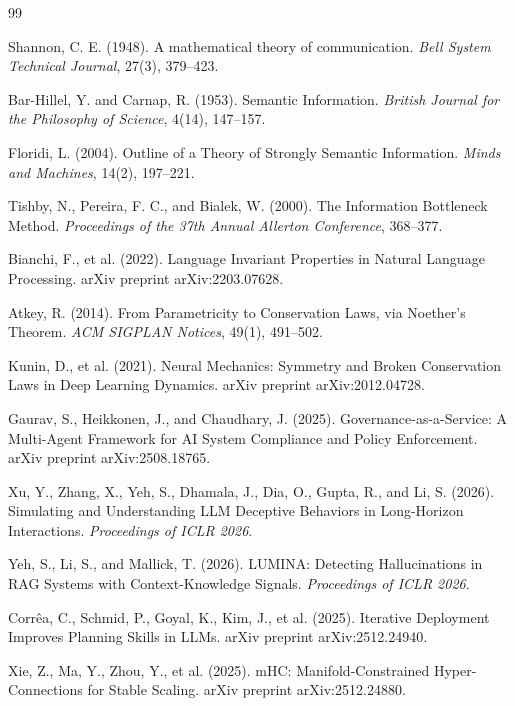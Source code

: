 \documentclass[11pt,a4paper]{article}
\begin{document}

\begin{thebibliography}{99}
\sloppy
\raggedright

Shannon, C. E. (1948).
A mathematical theory of communication.
\textit{Bell System Technical Journal}, 27(3), 379--423.

Bar-Hillel, Y. and Carnap, R. (1953).
Semantic Information.
\textit{British Journal for the Philosophy of Science}, 4(14), 147--157.

Floridi, L. (2004).
Outline of a Theory of Strongly Semantic Information.
\textit{Minds and Machines}, 14(2), 197--221.

Tishby, N., Pereira, F. C., and Bialek, W. (2000).
The Information Bottleneck Method.
\textit{Proceedings of the 37th Annual Allerton Conference}, 368--377.

Bianchi, F., et al. (2022).
Language Invariant Properties in Natural Language Processing.
arXiv preprint arXiv:2203.07628.

Atkey, R. (2014).
From Parametricity to Conservation Laws, via Noether's Theorem.
\textit{ACM SIGPLAN Notices}, 49(1), 491--502.

Kunin, D., et al. (2021).
Neural Mechanics: Symmetry and Broken Conservation Laws in Deep Learning Dynamics.
arXiv preprint arXiv:2012.04728.

Gaurav, S., Heikkonen, J., and Chaudhary, J. (2025).
Governance-as-a-Service: A Multi-Agent Framework for AI System Compliance and Policy Enforcement.
arXiv preprint arXiv:2508.18765.

Xu, Y., Zhang, X., Yeh, S., Dhamala, J., Dia, O., Gupta, R., and Li, S. (2026).
Simulating and Understanding LLM Deceptive Behaviors in Long-Horizon Interactions.
\textit{Proceedings of ICLR 2026}.

Yeh, S., Li, S., and Mallick, T. (2026).
LUMINA: Detecting Hallucinations in RAG Systems with Context-Knowledge Signals.
\textit{Proceedings of ICLR 2026}.

Corr\^ea, C., Schmid, P., Goyal, K., Kim, J., et al. (2025).
Iterative Deployment Improves Planning Skills in LLMs.
arXiv preprint arXiv:2512.24940.

Xie, Z., Ma, Y., Zhou, Y., et al. (2025).
mHC: Manifold-Constrained Hyper-Connections for Stable Scaling.
arXiv preprint arXiv:2512.24880.


\end{thebibliography}
\end{document}
